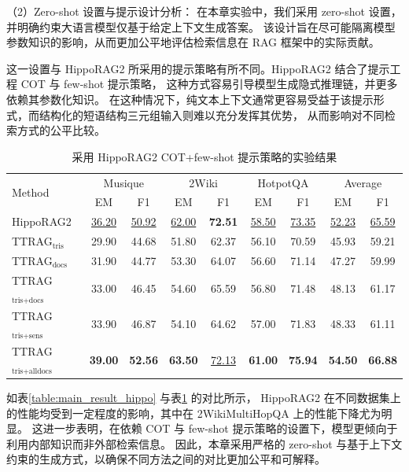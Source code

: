 （2）Zero-shot 设置与提示设计分析：
在本章实验中，我们采用 zero-shot 设置，并明确约束大语言模型仅基于给定上下文生成答案。
该设计旨在尽可能隔离模型参数知识的影响，从而更加公平地评估检索信息在 RAG 框架中的实际贡献。

这一设置与 HippoRAG2 所采用的提示策略有所不同。HippoRAG2 结合了提示工程 COT 与 few-shot 提示策略，
这种方式容易引导模型生成隐式推理链，并更多依赖其参数化知识。
在这种情况下，纯文本上下文通常更容易受益于该提示形式，而结构化的短语结构三元组输入则难以充分发挥其优势，
从而影响对不同检索方式的公平比较。

\begin{table}[htbp]
  \centering
  \caption{采用 HippoRAG2 COT+few-shot 提示策略的实验结果}
  \label{table:app_result_hippo2}
  \vspace{0.5em}\centering\wuhao
  \begin{tabular}{@{}lcccccccc@{}}
  \toprule[1.5pt]
  \multirow{2}{*}{Method} & \multicolumn{2}{c}{Musique} & \multicolumn{2}{c}{2Wiki} & \multicolumn{2}{c}{HotpotQA} & \multicolumn{2}{c}{Average} \\
  & EM & F1 & EM & F1 & EM & F1 & EM & F1 \\
  \midrule[1pt]
  HippoRAG2           & \underline{36.20} & \underline{50.92} & \underline{62.00} & \textbf{72.51} & \underline{58.50} & \underline{73.35} & \underline{52.23} & \underline{65.59} \\
  TTRAG$_\text{tris}$           & 29.90 & 44.68 & 51.80 & 62.37 & 56.10 & 70.59 & 45.93 & 59.21 \\
  TTRAG$_\text{docs}$           & 31.90 & 44.77 & 53.30 & 64.07 & 56.60 & 71.14 & 47.27 & 59.99 \\
  TTRAG$_\text{tris+docs}$      & 33.00 & 46.45 & 54.60 & 65.59 & 56.80 & 71.48 & 48.13 & 61.17 \\
  TTRAG$_\text{tris+sens}$      & 33.90 & 46.87 & 54.10 & 64.62 & 57.00 & 71.83 & 48.33 & 61.11 \\
  TTRAG$_\text{tris+alldocs}$ & \textbf{39.00} & \textbf{52.56} & \textbf{63.50} & \underline{72.13} & \textbf{61.00} & \textbf{75.94} & \textbf{54.50} & \textbf{66.88} \\
  \bottomrule[1.5pt]
  \end{tabular}%
\end{table}

如表\ref{table:main_result_hippo} 与表\ref{table:app_result_hippo2} 的对比所示，
HippoRAG2 在不同数据集上的性能均受到一定程度的影响，其中在 2WikiMultiHopQA 上的性能下降尤为明显。
这进一步表明，在依赖 COT 与 few-shot 提示策略的设置下，模型更倾向于利用内部知识而非外部检索信息。
因此，本章采用严格的 zero-shot 与基于上下文约束的生成方式，以确保不同方法之间的对比更加公平和可解释。

